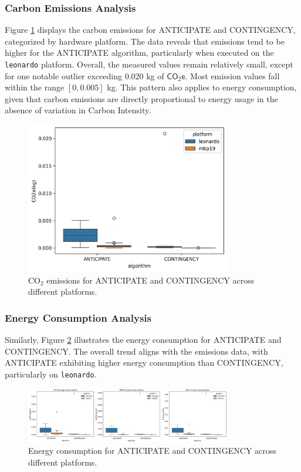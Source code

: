 \documentclass[a4paper,singleside,12pt]{report} %
\begin{document}
\subsubsection{Carbon Emissions Analysis}

Figure \ref{fig:ant_cont_emissions} displays the carbon emissions for ANTICIPATE and CONTINGENCY, categorized by hardware platform. The data reveals that emissions tend to be higher for the 
ANTICIPATE algorithm, particularly when executed on the \verb|leonardo| platform. Overall, the measured values remain relatively small, except for one notable outlier exceeding 0.020 kg of 
$\mathsf{CO_2e}$. Most emission values fall within the range $[0,0.005]$ kg. This pattern also applies to energy consumption, given that carbon emissions are directly proportional to energy 
usage in the absence of variation in Carbon Intensity.

\begin{figure}[h!]
    \centering
    \includegraphics[width=0.8\textwidth]{imgs/emissions_ant_cont.png}
    \caption{CO$_2$ emissions for ANTICIPATE and CONTINGENCY across different platforms.}
    \label{fig:ant_cont_emissions}
\end{figure}

\subsubsection{Energy Consumption Analysis}

Similarly, Figure \ref{fig:ant_cont_energy} illustrates the energy consumption for ANTICIPATE and CONTINGENCY. The overall trend aligns with the emissions data, with ANTICIPATE exhibiting higher 
energy consumption than CONTINGENCY, particularly on \verb|leonardo|.

\begin{figure}[h!]
    \centering
    \includegraphics[width=0.8\textwidth]{imgs/energy_ant_cont.png}
    \caption{Energy consumption for ANTICIPATE and CONTINGENCY across different platforms.}
    \label{fig:ant_cont_energy}
\end{figure}
\end{document}
